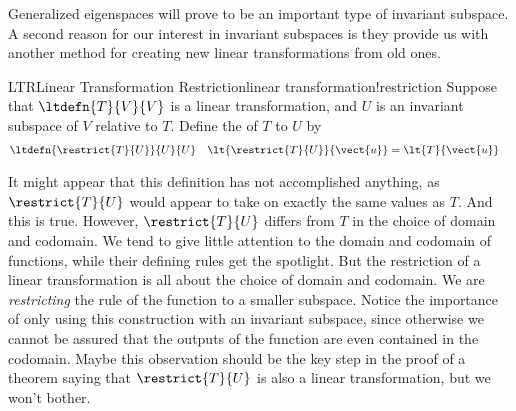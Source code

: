 %
%
Generalized eigenspaces will prove to be an important type of invariant subspace.  A second reason for our interest in invariant subspaces is they provide us with another method for creating new linear transformations from old ones.
%
\begin{definition}{LTR}{Linear Transformation Restriction}{linear transformation!restriction}
Suppose that $\ltdefn{T}{V}{V}$ is a linear transformation, and $U$ is an invariant subspace of $V$ relative to $T$.  Define the  of $T$ to $U$ by
%
\begin{align*}
\ltdefn{\restrict{T}{U}}{U}{U}&
&
\lt{\restrict{T}{U}}{\vect{u}}&=\lt{T}{\vect{u}}
\end{align*}
%
\end{definition}
%
It might appear that this definition has not accomplished anything, as $\restrict{T}{U}$ would appear to take on exactly the same values as $T$.  And this is true.  However, $\restrict{T}{U}$ differs from $T$ in the choice of domain and codomain.  We tend to give little attention to the domain and codomain of functions, while their defining rules get the spotlight.  But the restriction of a linear transformation is all about the choice of domain and codomain.  We are {\em restricting} the rule of the function to a smaller subspace.  Notice the importance of only using this construction with an invariant subspace, since otherwise we cannot be assured that the outputs of the function are even contained in the codomain.  Maybe this observation should be the key step in the proof of a theorem saying that $\restrict{T}{U}$ is also a linear transformation, but we won't bother.\par
%
